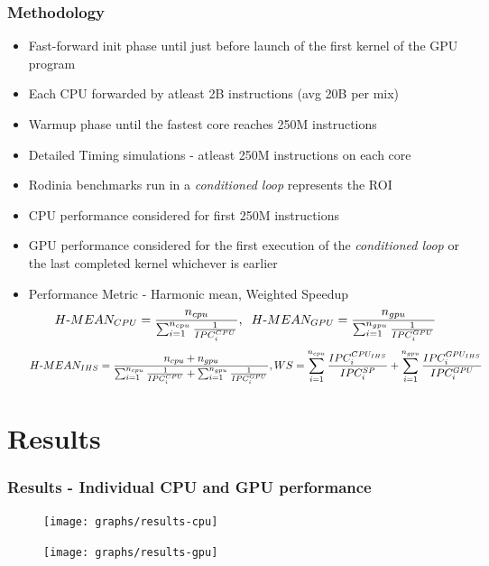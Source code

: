 \documentclass{beamer}
\begin{document}
\begin{frame}
\frametitle{Methodology}
\begin{itemize}
	\item Fast-forward init phase until just before launch of the first kernel of the GPU program
	\item Each CPU forwarded by atleast 2B instructions (avg 20B per mix)
	\item Warmup phase until the fastest core reaches 250M instructions
	\item Detailed Timing simulations - atleast 250M instructions on each core
	\item Rodinia benchmarks run in a \textit{conditioned loop} represents the ROI
	\item CPU performance considered for first 250M instructions
	\item GPU performance considered for the first execution of the \textit{conditioned loop} or the last completed kernel whichever is earlier
	\item Performance Metric - Harmonic mean, Weighted Speedup
	{\scriptsize
		\begin{equation*}
		H\textnormal{-}MEAN_{CPU} = \frac{n_{cpu}}{\sum_{i=1}^{n_{cpu}} \frac{1}{IPC_{i}^{CPU}}}, \hspace{0.2cm} H\textnormal{-}MEAN_{GPU} = \frac{n_{gpu}}{\sum_{i=1}^{n_{gpu}} \frac{1}{IPC_{i}^{GPU}}} 
		\end{equation*}
	}
	{\scriptsize
		\begin{equation*}
		H\textnormal{-}MEAN_{IHS} = \frac{n_{cpu}+ n_{gpu}}{\sum_{i=1}^{n_{cpu}} \frac{1}{IPC_{i}^{CPU}} + \sum_{i=1}^{n_{gpu}} \frac{1}{IPC_{i}^{GPU}}}, 
		WS = \sum_{i=1}^{n_{cpu}} \frac{IPC_i^{CPU_{IHS}}}{IPC_i^{SP}} + \sum_{i=1}^{n_{gpu}} \frac{IPC_i^{GPU_{IHS}}}{IPC_i^{GPU}}
		\end{equation*}
	}
\end{itemize}
\end{frame}


\section{Results}

\begin{frame}
\frametitle{Results - Individual CPU and GPU performance}
\begin{figure}
\texttt{[image: graphs/results-cpu]}
\end{figure}
\begin{figure}
\texttt{[image: graphs/results-gpu]}
\end{figure}
\end{frame}
\end{document}
